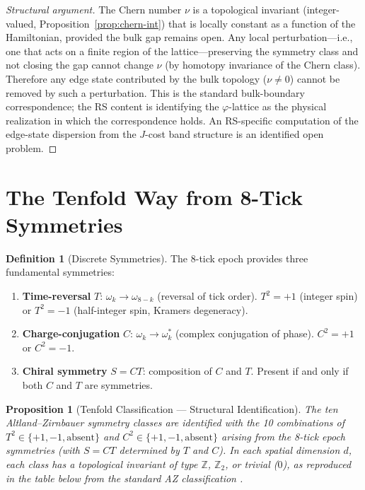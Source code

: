 \documentclass[12pt,a4paper]{article}
\newtheorem{proposition}[theorem]{Proposition}
\theoremstyle{definition}
\newtheorem{definition}[theorem]{Definition}
\theoremstyle{remark}
\begin{document}
\begin{proof}[Structural argument]
The Chern number $\nu$ is a topological invariant (integer-valued,
Proposition~\ref{prop:chern-int}) that is locally constant as a
function of the Hamiltonian, provided the bulk gap remains open.
Any local perturbation---i.e., one that acts on a finite region of
the lattice---preserving the symmetry class and not closing the gap
cannot change $\nu$ (by homotopy invariance of the Chern class).
Therefore any edge state contributed by the bulk topology ($\nu \neq 0$)
cannot be removed by such a perturbation.  This is the standard
bulk-boundary correspondence; the RS content is identifying the
$\varphi$-lattice as the physical realization in which the correspondence
holds.  An RS-specific computation of the edge-state dispersion from
the $J$-cost band structure is an identified open problem.
\end{proof}

\section{The Tenfold Way from 8-Tick Symmetries}
\label{sec:tenfold}

\begin{definition}[Discrete Symmetries]
The 8-tick epoch provides three fundamental symmetries:
\begin{enumerate}[label=(\roman*)]
  \item \textbf{Time-reversal} $T$: $\omega_k \to \omega_{8-k}$
  (reversal of tick order).  $T^2 = +1$ (integer spin) or
  $T^2 = -1$ (half-integer spin, Kramers degeneracy).

  \item \textbf{Charge-conjugation} $C$: $\omega_k \to \omega_k^*$
  (complex conjugation of phase).  $C^2 = +1$ or $C^2 = -1$.

  \item \textbf{Chiral symmetry} $S = CT$: composition of $C$
  and $T$.  Present if and only if both $C$ and $T$ are
  symmetries.
\end{enumerate}
\end{definition}

\begin{proposition}[Tenfold Classification --- Structural Identification]
\label{thm:tenfold}
The ten Altland--Zirnbauer symmetry classes are identified with
the 10 combinations of $T^2 \in \{+1, -1, \text{absent}\}$ and
$C^2 \in \{+1, -1, \text{absent}\}$ arising from the 8-tick epoch
symmetries (with $S = CT$ determined by $T$ and $C$).  In each
spatial dimension $d$, each class has a topological invariant of
type $\mathbb{Z}$, $\mathbb{Z}_2$, or trivial ($0$), as
reproduced in the table below from the standard AZ classification
\cite{Altland1997}.
\end{proposition}
\end{document}
